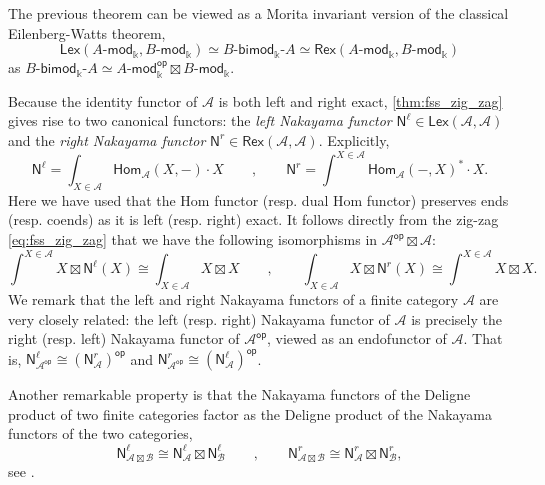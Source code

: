 \documentclass[11pt]{article}
\theoremstyle{definition}
\begin{document}
The previous theorem can be viewed as a Morita invariant version of the classical Eilenberg-Watts theorem,
$$  \mathsf{Lex}(A\text{-}\mathsf{mod}_\Bbbk, B\text{-}\mathsf{mod}_\Bbbk) \simeq  B\text{-}\mathsf{bimod}_\Bbbk \text{-} A \simeq \mathsf{Rex}(A\text{-}\mathsf{mod}_\Bbbk, B\text{-}\mathsf{mod}_\Bbbk)  $$ as $B\text{-}\mathsf{bimod}_\Bbbk \text{-} A \simeq  A\text{-}\mathsf{mod}_\Bbbk^\mathsf{op} \boxtimes B\text{-}\mathsf{mod}_\Bbbk$.

Because the identity functor of $\mathcal{A}$ is both left and right exact, \cref{thm:fss_zig_zag} gives rise to two canonical functors: the \emph{left Nakayama functor} $\mathsf{N}^\ell \in \mathsf{Lex}(\mathcal{A}, \mathcal{A})$ and the \emph{right Nakayama functor} $\mathsf{N}^r \in \mathsf{Rex}(\mathcal{A}, \mathcal{A})$. Explicitly,
\begin{equation}\label{eq:Nakayama_functors}
\mathsf{N}^\ell= \int_{X\in \mathcal{A}} \mathsf{Hom}_\mathcal{A} (X,-) \cdot X \qquad , \qquad \mathsf{N}^r= \int^{X\in \mathcal{A}} \mathsf{Hom}_\mathcal{A} (-,X)^* \cdot X  .
\end{equation}
Here we have used that the Hom functor (resp. dual Hom functor) preserves ends (resp. coends) as it is left (resp. right) exact. It follows directly from the zig-zag \eqref{eq:fss_zig_zag} that we have the following isomorphisms in $\mathcal{A}^\mathsf{op} \boxtimes \mathcal{A}$:
\begin{equation}
\int^{X \in \mathcal{A}} X \boxtimes \mathsf{N}^\ell(X) \cong \int_{X \in \mathcal{A}}  X \boxtimes X \qquad ,  \qquad  \int_{X \in \mathcal{A}} X \boxtimes \mathsf{N}^r(X) \cong \int^{X \in \mathcal{A}}  X \boxtimes X.
\end{equation}
We remark that the left and right Nakayama functors of a finite category $\mathcal{A}$ are very closely related: the left (resp. right) Nakayama functor of $\mathcal{A}$ is precisely the right (resp. left) Nakayama functor of $\mathcal{A}^\mathsf{op}$, viewed as an endofunctor of $\mathcal{A}$. That is, $\mathsf{N}^\ell_{\mathcal{A}^\mathsf{op}}\cong (\mathsf{N}^r_{\mathcal{A}})^\mathsf{op}$ and $\mathsf{N}^r_{\mathcal{A}^\mathsf{op}}\cong (\mathsf{N}^\ell_{\mathcal{A}})^\mathsf{op}$.


Another remarkable property is that the Nakayama functors of the Deligne product of two finite categories factor as the Deligne product of the Nakayama functors of the two categories,
\begin{equation}
\mathsf{N}^\ell_{\mathcal{A} \boxtimes \mathcal{B}} \cong \mathsf{N}^\ell_{\mathcal{A} } \boxtimes \mathsf{N}^\ell_{\mathcal{B}} \qquad , \qquad  \mathsf{N}^r_{\mathcal{A} \boxtimes \mathcal{B}} \cong \mathsf{N}^r_{\mathcal{A} } \boxtimes \mathsf{N}^r_{\mathcal{B}},
\end{equation}
see \cite[Proposition 3.20]{fss}.
\end{document}
